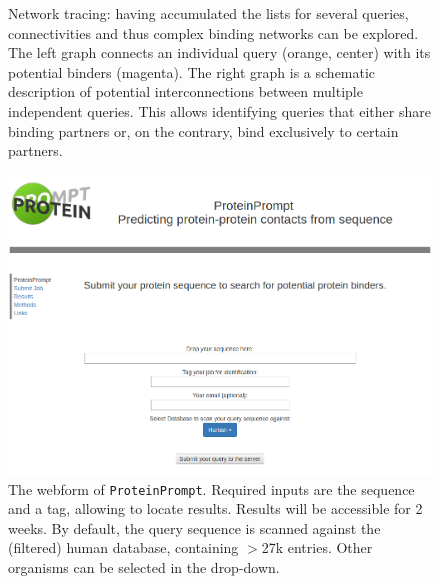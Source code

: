 \documentclass{article}
\newcommand{\tool}{\texttt{ProteinPrompt}}
\begin{document}
\begin{figure}
  
  \caption{Network tracing: having accumulated the lists for several queries, connectivities and thus complex binding networks can be explored.
   The left graph connects an individual query (orange, center) with its potential binders (magenta).
   The right graph is a schematic description of potential interconnections between multiple independent queries.
   This allows identifying queries that either share binding partners or, on the contrary, bind exclusively to certain partners. }
  \label{fig:connect}
\end{figure}

\begin{figure}
  \hspace{-1.5cm}\includegraphics[width=1.2\linewidth]{material/webform.png}
  \caption{ The webform of \tool.
    Required inputs are the sequence and a tag, allowing to locate results.
    Results will be accessible for 2 weeks.
    By default, the query sequence is scanned against the (filtered) human database, containing $>$27k entries.
    Other organisms can be selected in the drop-down.}
  \label{fig:webform}
\end{figure}





\end{document}
